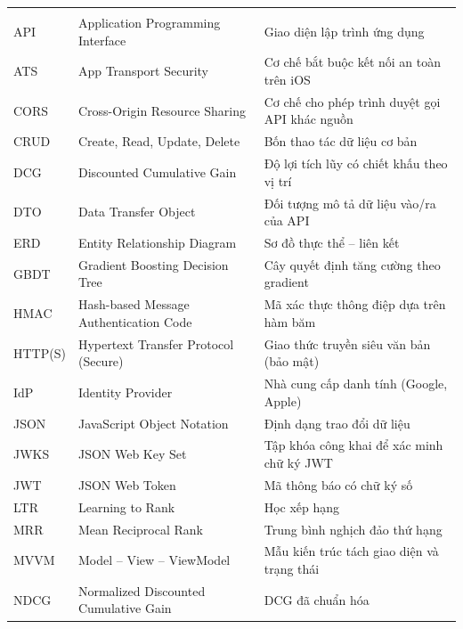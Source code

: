 
\begin{rtable}
\begin{longtable}{|C{2.6cm}|L{6.2cm}|L{5.9cm}|}
\hline
{} &  &  \\ \hline
\endfirsthead
\hline
{} &  &  \\ \hline
\endhead
API & Application Programming Interface & Giao diện lập trình ứng dụng \\ \hline
ATS & App Transport Security & Cơ chế bắt buộc kết nối an toàn trên iOS \\ \hline
CORS & Cross-Origin Resource Sharing & Cơ chế cho phép trình duyệt gọi API khác nguồn \\ \hline
CRUD & Create, Read, Update, Delete & Bốn thao tác dữ liệu cơ bản \\ \hline
DCG & Discounted Cumulative Gain & Độ lợi tích lũy có chiết khấu theo vị trí \\ \hline
DTO & Data Transfer Object & Đối tượng mô tả dữ liệu vào/ra của API \\ \hline
ERD & Entity Relationship Diagram & Sơ đồ thực thể -- liên kết \\ \hline
GBDT & Gradient Boosting Decision Tree & Cây quyết định tăng cường theo gradient \\ \hline
HMAC & Hash-based Message Authentication Code & Mã xác thực thông điệp dựa trên hàm băm \\ \hline
HTTP(S) & Hypertext Transfer Protocol (Secure) & Giao thức truyền siêu văn bản (bảo mật) \\ \hline
IdP & Identity Provider & Nhà cung cấp danh tính (Google, Apple) \\ \hline
JSON & JavaScript Object Notation & Định dạng trao đổi dữ liệu \\ \hline
JWKS & JSON Web Key Set & Tập khóa công khai để xác minh chữ ký JWT \\ \hline
JWT & JSON Web Token & Mã thông báo có chữ ký số \\ \hline
LTR & Learning to Rank & Học xếp hạng \\ \hline
MRR & Mean Reciprocal Rank & Trung bình nghịch đảo thứ hạng \\ \hline
MVVM & Model -- View -- ViewModel & Mẫu kiến trúc tách giao diện và trạng thái \\ \hline
NDCG & Normalized Discounted Cumulative Gain & DCG đã chuẩn hóa \\ \hline

\end{longtable}
\end{rtable}
